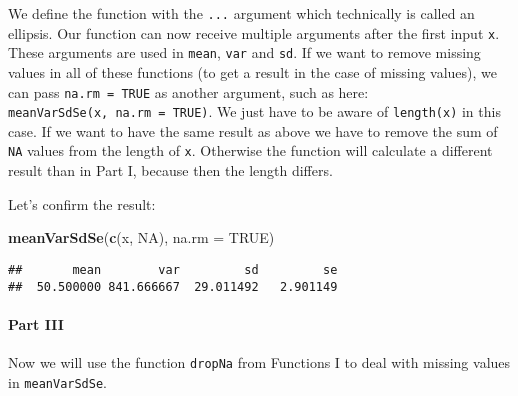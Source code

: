 \documentclass[11,]{article}
\newenvironment{Shaded}{\begin{snugshade}}{\end{snugshade}}
\newcommand{\KeywordTok}[1]{\textcolor[rgb]{0.13,0.29,0.53}{\textbf{{#1}}}}
\newcommand{\DataTypeTok}[1]{\textcolor[rgb]{0.13,0.29,0.53}{{#1}}}
\newcommand{\OtherTok}[1]{\textcolor[rgb]{0.56,0.35,0.01}{{#1}}}
\newcommand{\NormalTok}[1]{{#1}}
\let\oldparagraph\paragraph
\renewcommand{\paragraph}[1]{\oldparagraph{#1}\mbox{}}
\begin{document}
We define the function with the \texttt{...} argument which technically
is called an ellipsis. Our function can now receive multiple arguments
after the first input \texttt{x}. These arguments are used in
\texttt{mean}, \texttt{var} and \texttt{sd}. If we want to remove
missing values in all of these functions (to get a result in the case of
missing values), we can pass \texttt{na.rm\ =\ TRUE} as another
argument, such as here: \texttt{meanVarSdSe(x,\ na.rm\ =\ TRUE)}. We
just have to be aware of \texttt{length(x)} in this case. If we want to
have the same result as above we have to remove the sum of \texttt{NA}
values from the length of \texttt{x}. Otherwise the function will
calculate a different result than in Part I, because then the length
differs.

Let's confirm the result:

\begin{Shaded}
\begin{Highlighting}[]
\KeywordTok{meanVarSdSe}\NormalTok{(}\KeywordTok{c}\NormalTok{(x, }\OtherTok{NA}\NormalTok{), }\DataTypeTok{na.rm =} \OtherTok{TRUE}\NormalTok{)}
\end{Highlighting}
\end{Shaded}

\begin{verbatim}
##       mean        var         sd         se 
##  50.500000 841.666667  29.011492   2.901149
\end{verbatim}

\paragraph{Part III}\label{part-iii}

Now we will use the function \texttt{dropNa} from Functions I to deal
with missing values in \texttt{meanVarSdSe}.
\end{document}
